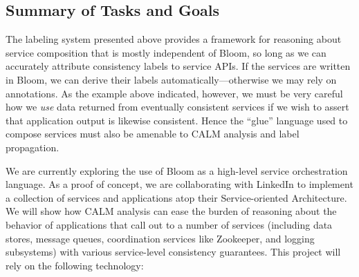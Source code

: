 \subsection{Summary of Tasks and Goals}

The labeling system presented above provides a framework for reasoning about service composition that is 
mostly independent of Bloom, so long as we can accurately attribute consistency labels to service APIs.
If the services are written in Bloom, we can derive their labels automatically---otherwise we may rely on annotations.
As the example above indicated, however, we must be very careful how we \emph{use} data returned from 
eventually consistent services
if we wish to assert that application output is likewise consistent.  Hence the ``glue'' language used
to compose services must also be amenable to CALM analysis and label propagation.

We are currently exploring the use of Bloom as a high-level service orchestration language.
As a proof of concept, we are collaborating with LinkedIn to implement a collection of services and applications atop
their Service-oriented Architecture.
We will show how CALM analysis can ease the burden of reasoning about the behavior of applications
that call out to a number of services (including data stores, message queues, coordination services like Zookeeper, 
and logging subsystems)
with various service-level consistency guarantees.
This project will rely on the following technology:

